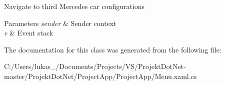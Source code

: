 Navigate to third Mercedes car configurations 


\begin{DoxyParams}{Parameters}
{\em sender} & Sender context\\
\hline
{\em e} & Event stack\\
\hline
\end{DoxyParams}


The documentation for this class was generated from the following file\+:\begin{DoxyCompactItemize}
\item 
C\+:/\+Users/lukas\+\_/\+Documents/\+Projects/\+V\+S/\+Projekt\+Dot\+Net-\/master/\+Projekt\+Dot\+Net/\+Project\+App/\+Project\+App/Menu.\+xaml.\+cs\end{DoxyCompactItemize}
